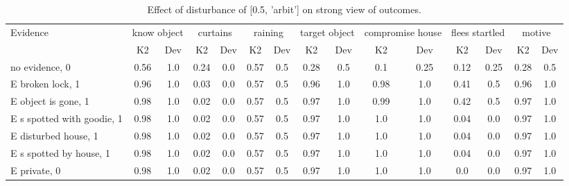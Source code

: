 \begin{table}\begin{tabular}{l|cc|cc|cc|cc|cc|cc|cc}\toprule\multirow{2}{*}{Evidence} & \multicolumn{2}{c}{know object}& \multicolumn{2}{c}{curtains}& \multicolumn{2}{c}{raining}& \multicolumn{2}{c}{target object}& \multicolumn{2}{c}{compromise house}& \multicolumn{2}{c}{flees startled}& \multicolumn{2}{c}{motive}\\& {K2} & {Dev}& {K2} & {Dev}& {K2} & {Dev}& {K2} & {Dev}& {K2} & {Dev}& {K2} & {Dev}& {K2} & {Dev}\\\midrule
no evidence, 0 & \cellcolor{Bittersweet}0.56&\cellcolor{Bittersweet}1.0&\cellcolor{Bittersweet}0.24&\cellcolor{Bittersweet}0.0&\cellcolor{Bittersweet}0.57&\cellcolor{Bittersweet}0.5&\cellcolor{Bittersweet}0.28&\cellcolor{Bittersweet}0.5&\cellcolor{Bittersweet}0.1&\cellcolor{Bittersweet}0.25&\cellcolor{Bittersweet}0.12&\cellcolor{Bittersweet}0.25&\cellcolor{Bittersweet}0.28&\cellcolor{Bittersweet}0.5\\E broken lock, 1 & 0.96&1.0&0.03&0.0&\cellcolor{Bittersweet}0.57&\cellcolor{Bittersweet}0.5&0.96&1.0&0.98&1.0&\cellcolor{Bittersweet}0.41&\cellcolor{Bittersweet}0.5&0.96&1.0\\E object is gone, 1 & 0.98&1.0&0.02&0.0&\cellcolor{Bittersweet}0.57&\cellcolor{Bittersweet}0.5&0.97&1.0&0.99&1.0&\cellcolor{Bittersweet}0.42&\cellcolor{Bittersweet}0.5&0.97&1.0\\E s spotted with goodie, 1 & 0.98&1.0&0.02&0.0&\cellcolor{Bittersweet}0.57&\cellcolor{Bittersweet}0.5&0.97&1.0&1.0&1.0&0.04&0.0&0.97&1.0\\E disturbed house, 1 & 0.98&1.0&0.02&0.0&\cellcolor{Bittersweet}0.57&\cellcolor{Bittersweet}0.5&0.97&1.0&1.0&1.0&0.04&0.0&0.97&1.0\\E s spotted by house, 1 & 0.98&1.0&0.02&0.0&\cellcolor{Bittersweet}0.57&\cellcolor{Bittersweet}0.5&0.97&1.0&1.0&1.0&0.04&0.0&0.97&1.0\\E private, 0 & 0.98&1.0&0.02&0.0&\cellcolor{Bittersweet}0.57&\cellcolor{Bittersweet}0.5&0.97&1.0&1.0&1.0&0.0&0.0&0.97&1.0\\\bottomrule\end{tabular}\caption{Effect of disturbance of [0.5, 'arbit'] on strong view of outcomes.}\end{table}